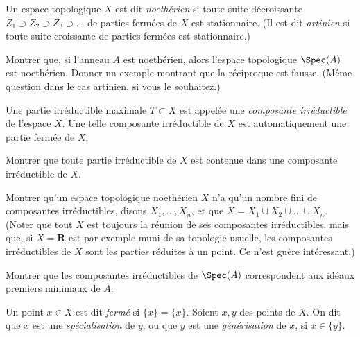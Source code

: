 \begin{definition}
\label{definition-Noetherian-space}
Un espace topologique $X$ est dit {\it noethérien} si toute
suite décroissante $Z_1\supset Z_2 \supset Z_3\supset \ldots$
de parties fermées de $X$ est stationnaire.
(Il est dit {\it artinien} si toute suite croissante de parties
fermées est stationnaire.)
\end{definition}

\begin{exercise}
\label{exercise-Noetherian-spec}
Montrer que, si l'anneau $A$ est noethérien, alors
l'espace topologique $\Spec(A)$ est noethérien. Donner un
exemple montrant que la réciproque est fausse. (Même question dans le cas
artinien, si vous le souhaitez.)
\end{exercise}

\begin{definition}
\label{definition-irreducible-component}
Une partie irréductible maximale $T\subset X$ est appelée une
{\it composante irréductible} de l'espace $X$. Une telle composante
irréductible de $X$ est automatiquement une partie fermée de $X$.
\end{definition}

\begin{exercise}
\label{exercise-irreducible-in-irreducible}
Montrer que toute partie irréductible
de $X$ est contenue dans une composante irréductible de $X$.
\end{exercise}

\begin{exercise}
\label{exercise-Noetherian-finite-nr-irreducible}
Montrer qu'un espace topologique noethérien $X$
n'a qu'un nombre fini de composantes irréductibles, disons $X_1, \ldots, X_n$,
et que $X = X_1\cup X_2\cup\ldots\cup X_n$. (Noter que
tout $X$ est toujours la réunion de ses composantes irréductibles, mais que,
si $X = {\mathbf R}$ est par exemple muni de sa topologie usuelle, les composantes irréductibles
de $X$ sont les parties réduites à un point. Ce n'est guère
intéressant.)
\end{exercise}

\begin{exercise}
\label{exercise-irreducible-components-minimal-primes}
Montrer que les composantes irréductibles de $\Spec(A)$
correspondent aux idéaux premiers minimaux de $A$.
\end{exercise}

\begin{definition}
\label{definition-closed}
Un point $x\in X$ est dit {\it fermé} si $\overline{\{x\}} = \{ x\}$.
Soient $x, y$ des points de $X$. On dit que $x$ est une {\it spécialisation}
de $y$, ou que $y$ est une {\it générisation} de $x$, si
$x\in \overline{\{y\}}$.
\end{definition}

